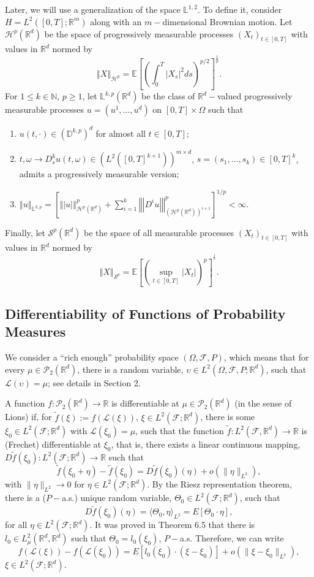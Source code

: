 \documentclass[12,english]{amsart}
\theoremstyle{plain}
\theoremstyle{definition}
\theoremstyle{plain}
\theoremstyle{plain}
\theoremstyle{remark}
\newcommand{\E}{\mathbb E}
\newcommand{\D}{\mathbb D}
\newcommand{\R}{\mathbb R}
\newcommand{\cF}{\mathcal F}
\newcommand{\cH}{\mathcal H}
\newcommand{\cL}{\mathcal L}
\newcommand{\cP}{\mathcal P}
\newcommand{\cS}{\mathcal S}
\newcommand{\mL}{\mathbb L}
\begin{document}
Later, we will use a generalization of the space $\mL^{1,2}$.
To define it, consider $H=L^2(\left[0,T\right];\R^m)$
along with an $m-$dimensional Brownian motion. Let $\cH^p(\R^d)$
be the space of progressively measurable processes $(X_t)_{t\in\left[0,T\right]}$
with values in $\R^d$ normed by 
\[
\left\Vert X\right\Vert _{\cH^p}=\E\left[\left(\int_0^T\left|X_s\right|^2ds\right)^{p/2}\right]^{\frac1p}.
\]
For $1\leq k\in\mathbb{N}$, $p\geq1$, let $\mL^{k,p}(\R^d)$
be the class of $\R^d-$valued progressively measurable
processes $u=(u^1,\ldots,u^d)$ on $\left[0,T\right]\times\Omega$
such that
\begin{enumerate}
\item $u(t,\cdot)\in(\D^{k,p})^d$ for almost
all $t\in\left[0,T\right]$;
\item $t,\omega\to D_s^ku(t,\omega)\in(L^2(\left[0,T\right]^{k+1}))^{m\times d}$,
$s=(s_1,\ldots,s_k)\in\left[0,T\right]^k$, admits
a progressively measurable version;
\item $\left\Vert u\right\Vert _{\mL^{k,p}}=\left[\left\Vert \left|u\right|\right\Vert _{\cH^p(\R^d)}^p+\sum_{i=1}^k\left\Vert \left|D^iu\right|\right\Vert _{(\cH^p(\R^d))^{i+1}}^p\right]^{1/p}<\infty.$
\end{enumerate}
Finally, let $\cS^p(\R^d)$ be the
space of all measurable processes $(X_t)_{t\in\left[0,T\right]}$
with values in $\R^d$ normed by
\[
\left\Vert X\right\Vert _{\cS^p}=\E\left[\left(\sup_{t\in[0,T]}\left|X_t\right|\right)^p\right]^{^{\frac1p}}.
\]

\subsection{Differentiability of Functions of Probability Measures}
\label{sec:diff-meas}
We consider a ``rich enough'' probability space $\left(\Omega,\mathcal{F},P\right)$,
which means that for every $\mu\in\mathcal{P}_{2}\left(\mathbb{R}^{d}\right)$,
there is a random variable, $\upsilon\in L^{2}\left(\Omega,\mathcal{F},P;\mathbb{R}^{d}\right)$,
such that $\mathcal{L}\left(\upsilon\right)=\mu$; see details in
\cite{buckdahn2017mean} Section 2. 

A function $f:\cP_2(\R^d)\to\R$
is differentiable at $\mu\in\cP_2(\R^d)$
(in the sense of Lions) if, for $\tilde{f}(\xi):=f(\cL(\xi))$,
$\xi\in L^2(\cF;\R^d)$, there is some
$\xi_0\in L^2(\cF;\R^d)$ with $\cL(\xi_0)=\mu$,
such that the function $\tilde{f}:L^2(\cF,\R^d)\to\R$
is (Frechet) differentiable at $\xi_0$, that is, there exists a
linear continuous mapping, $D\tilde{f}(\xi_0):L^2(\cF;\R^d)\to\R$
such that
\[
\tilde{f}(\xi_0+\eta)-\tilde{f}(\xi_0)=D\tilde{f}(\xi_0)(\eta)+o(\| \eta\| _{L^2}),
\]
with $\| \eta\| _{L^2}\to0$ for $\eta\in L^2(\cF;\R^d)$.
By the Riesz representation theorem, there is a ($P-$a.s.) unique
random variable, $\Theta_0\in L^2(\cF;\R^d)$,
such that
\[
D\tilde{f}(\xi_0)(\eta)=\langle \Theta_0,\eta\rangle _{L^2}=E[\Theta_0\cdot\eta],
\]
for all $\eta\in L^2(\cF;\R^d)$. It was proved in
\cite{cardaliaguet2010notes} Theorem 6.5 that there is  $l_0\in L^2_\mu(\R^d,\R^d)$
such that $\Theta_0=l_0(\xi_0)$, $P-$a.s. Therefore,
we can write
\[
f(\cL(\xi))-f(\cL(\xi_0))=E[l_0(\xi_0)\cdot(\xi-\xi_0)]+o(\| \xi-\xi_0\| _{L^2}),
\]
$\xi\in L^2(\cF;\R^d)$.
\end{document}
